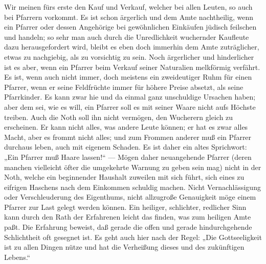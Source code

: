 Wir meinen fürs erste den Kauf und Verkauf, welcher bei allen Leuten, so auch bei Pfarrern vorkommt. Es ist schon ärgerlich und dem Amte nachtheilig, wenn ein Pfarrer oder dessen Angehörige bei gewöhnlichen Einkäufen jüdisch feilschen und handeln; so sehr man auch durch die Unredlichkeit wuchernder Kaufleute dazu herausgefordert wird, bleibt es eben doch immerhin dem Amte zuträglicher, etwas zu nachgiebig, als zu vorsichtig zu sein. Noch ärgerlicher und hinderlicher ist es aber, wenn ein Pfarrer beim Verkauf seiner Naturalien melkförmig verfährt. Es ist, wenn auch nicht immer, doch meistens ein zweideutiger Ruhm für einen Pfarrer, wenn er seine Feldfrüchte immer für höhere Preise absetzt, als seine Pfarrkinder. Es kann zwar hie und da einmal ganz unschuldige Ursachen haben; aber dem sei, wie es will, ein Pfarrer soll es mit seiner Waare nicht aufs Höchste treiben. Auch die Noth soll ihn nicht vermögen, den Wucherern gleich zu erscheinen. Er kann nicht alles, was andere Leute können; er hat es zwar alles Macht, aber es frommt
nicht alles; und zum Frommen anderer muß ein Pfarrer durchaus leben, auch mit eigenem Schaden. Es ist daher ein altes Sprichwort: „Ein Pfarrer muß Haare lassen!“ — Mögen daher neuangehende Pfarrer (deren manchen vielleicht öfter die umgekehrte Warnung zu geben sein mag) nicht in der Noth, welche ein beginnender Haushalt zuweilen mit sich führt, sich eines zu eifrigen Haschens nach dem Einkommen schuldig machen. Nicht Vernachlässigung oder Verschleuderung des Eigenthums, nicht allzugroße Genauigkeit möge einem Pfarrer zur Last gelegt werden können. Ein heiliger, schlichter, redlicher Sinn kann durch den Rath der Erfahrenen leicht das finden, was zum heiligen Amte paßt. Die Erfahrung beweist, daß gerade die offen und gerade hindurchgehende Schlichtheit oft gesegnet ist. Es geht auch hier nach der Regel: „Die Gottseeligkeit ist zu allen Dingen nütze und hat die Verheißung dieses und des zukünftigen Lebens.“

